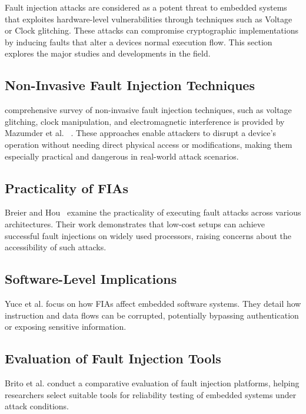 Fault injection attacks are considered as a potent threat to embedded systems that exploites hardware-level vulnerabilities through techniques such as Voltage or Clock glitching. These attacks can compromise cryptographic implementations by inducing faults that alter a devices normal execution flow. This section explores the major studies and developments in the field.

\subsection*{Non-Invasive Fault Injection Techniques}

comprehensive survey of non-invasive fault injection techniques, such as voltage glitching, clock manipulation, and electromagnetic interference is provided by Mazumder et al.~\cite{mazumder2023comprehensive} . These approaches enable attackers to disrupt a device's operation without needing direct physical access or modifications, making them especially practical and dangerous in real-world attack scenarios.

\subsection*{Practicality of FIAs}
Breier and Hou~\cite{breier2022practical} examine the practicality of executing fault attacks across various architectures. Their work demonstrates that low-cost setups can achieve successful fault injections on widely used processors, raising concerns about the accessibility of such attacks.

\subsection*{Software-Level Implications}
Yuce et al.\cite{yuce2020fault} focus on how FIAs affect embedded software systems. They detail how instruction and data flows can be corrupted, potentially bypassing authentication or exposing sensitive information.



\subsection*{Evaluation of Fault Injection Tools}
Brito et al. \cite{brito2023evaluation} conduct a comparative evaluation of fault injection platforms, helping researchers select suitable tools for reliability testing of embedded systems under attack conditions.

